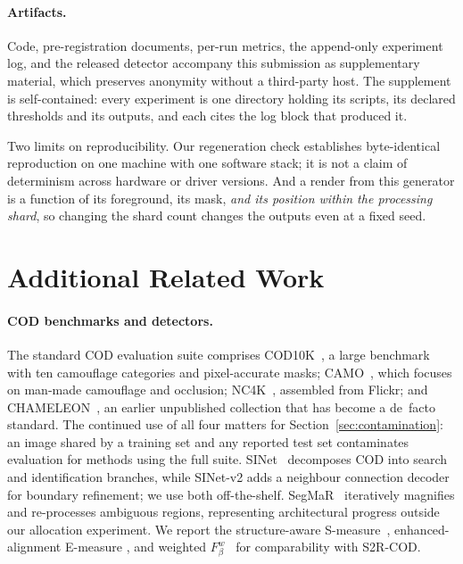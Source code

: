 \documentclass{article} %
\begin{document}
\paragraph{Artifacts.} Code, pre-registration documents, per-run metrics, the append-only experiment
log, and the released detector accompany this submission as supplementary material, which preserves
anonymity without a third-party host.
The supplement is self-contained: every experiment is one directory holding its
scripts, its declared thresholds and its outputs, and each cites the log block that produced it.

Two limits on reproducibility. Our regeneration check
establishes byte-identical reproduction on one machine with one software stack; it is not a claim of
determinism across hardware or driver versions. And a render from this generator is a function of its
foreground, its mask, \emph{and its position within the processing shard}, so changing the shard count
changes the outputs even at a fixed seed.




\appendix

\section{Additional Related Work}
\label{app:related}

\paragraph{COD benchmarks and detectors.}
The standard COD evaluation suite comprises COD10K~\cite{fan2022concealed}, a large benchmark
with ten camouflage categories and pixel-accurate masks; CAMO~\cite{le2019anabranch}, which focuses
on man-made camouflage and occlusion; NC4K~\cite{lv2021simultaneously}, assembled from Flickr; and
CHAMELEON~\cite{skurowski2018animal}, an earlier unpublished collection that has become a de~facto
standard. The continued use of all four matters for Section~\ref{sec:contamination}: an image shared
by a training set and any reported test set contaminates evaluation for methods using the full suite.
SINet~\cite{fan2020sinet} decomposes COD into search and identification branches, while SINet-v2
\cite{fan2022concealed} adds a neighbour connection decoder for boundary refinement; we use both
off-the-shelf. SegMaR~\cite{jia2022segment} iteratively magnifies and re-processes ambiguous
regions, representing architectural progress outside our allocation experiment. We report the
structure-aware S-measure~\cite{fan2017structure}, enhanced-alignment E-measure
\cite{fan2018enhanced}, and weighted $F_\beta^w$~\cite{margolin2014evaluate} for comparability
with S2R-COD.
\end{document}

